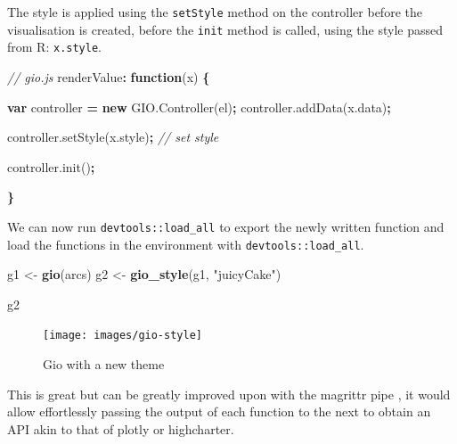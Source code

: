 \documentclass[
  10pt,
]{krantz}
\makeatletter
\newenvironment{Shaded}{\begin{snugshade}}{\end{snugshade}}
\newcommand{\AttributeTok}[1]{\textcolor[rgb]{0.61,0.61,0.61}{#1}}
\newcommand{\CommentTok}[1]{\textcolor[rgb]{0.37,0.37,0.37}{\textit{#1}}}
\newcommand{\KeywordTok}[1]{\textcolor[rgb]{0.27,0.27,0.27}{\textbf{#1}}}
\newcommand{\NormalTok}[1]{#1}
\newcommand{\OperatorTok}[1]{\textcolor[rgb]{0.43,0.43,0.43}{\textbf{#1}}}
\newcommand{\StringTok}[1]{\textcolor[rgb]{0.5,0.5,0.5}{#1}}
\newcommand{\VariableTok}[1]{\textcolor[rgb]{0,0,0}{#1}}
\newenvironment{kframe}{%
\medskip{}
\setlength{\fboxsep}{.8em}
 \def\at@end@of@kframe{}%
 \ifinner\ifhmode%
  \def\at@end@of@kframe{\end{minipage}}%
  \begin{minipage}{\columnwidth}%
 \fi\fi%
 \def\FrameCommand##1{\hskip\@totalleftmargin \hskip-\fboxsep
 \colorbox{shadecolor}{##1}\hskip-\fboxsep
     \hskip-\linewidth \hskip-\@totalleftmargin \hskip\columnwidth}%
 \MakeFramed {\advance\hsize-\width
   \@totalleftmargin\z@ \linewidth\hsize
   \@setminipage}}%
 {\par\unskip\endMakeFramed%
 \at@end@of@kframe}
\renewenvironment{Shaded}{\begin{kframe}}{\end{kframe}}
\makeatother
\begin{document}
The style is applied using the \texttt{setStyle} method on the controller before the visualisation is created, before the \texttt{init} method is called, using the style passed from R: \texttt{x.style}.

\begin{Shaded}
\begin{Highlighting}[]
\CommentTok{// gio.js}
\NormalTok{renderValue}\OperatorTok{:} \KeywordTok{function}\NormalTok{(x) }\OperatorTok{\{}

  \KeywordTok{var}\NormalTok{ controller }\OperatorTok{=} \KeywordTok{new} \VariableTok{GIO}\NormalTok{.}\AttributeTok{Controller}\NormalTok{(el)}\OperatorTok{;}
  \VariableTok{controller}\NormalTok{.}\AttributeTok{addData}\NormalTok{(}\VariableTok{x}\NormalTok{.}\AttributeTok{data}\NormalTok{)}\OperatorTok{;} 

  \VariableTok{controller}\NormalTok{.}\AttributeTok{setStyle}\NormalTok{(}\VariableTok{x}\NormalTok{.}\AttributeTok{style}\NormalTok{)}\OperatorTok{;} \CommentTok{// set style}

  \VariableTok{controller}\NormalTok{.}\AttributeTok{init}\NormalTok{()}\OperatorTok{;}

\OperatorTok{\}}
\end{Highlighting}
\end{Shaded}

We can now run \texttt{devtools::load\_all} to export the newly written function and load the functions in the environment with \texttt{devtools::load\_all}.

\begin{Shaded}
\begin{Highlighting}[]
\NormalTok{g1 <{-}}\StringTok{ }\KeywordTok{gio}\NormalTok{(arcs)}
\NormalTok{g2 <{-}}\StringTok{ }\KeywordTok{gio\_style}\NormalTok{(g1, }\StringTok{"juicyCake"}\NormalTok{)}

\NormalTok{g2}
\end{Highlighting}
\end{Shaded}

\begin{figure}[H]

{\centering \texttt{[image: images/gio-style]} 

}

\caption{Gio with a new theme}\label{fig:gio-style}
\end{figure}

This is great but can be greatly improved upon with the magrittr pipe \citep{R-magrittr}, it would allow effortlessly passing the output of each function to the next to obtain an API akin to that of plotly or highcharter.
\end{document}
